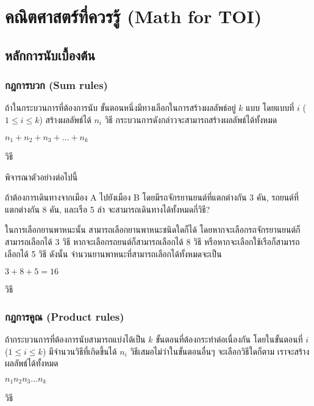 \chapter{คณิตศาสตร์ที่ควรรู้ (Math for TOI)}
\section{หลักการนับเบื้องต้น}
\subsection{กฎการบวก (Sum rules)}
\begin{theorem}
ถ้าในกระบวนการที่ต้องการนับ ขั้นตอนหนึ่งมีทางเลือกในการสร้างผลลัพธ์อยู่ $k$ แบบ โดยแบบที่ $i$ ($1 \leq i \leq k$) สร้างผลลัพธ์ได้ $n_i$ วิธี กระบวนการดังกล่าวจะสามารถสร้างผลลัพธ์ได้ทั้งหมด
\begin{center}
$n_1+n_2+n_3+...+n_k$
\end{center}
วิธี  
\end{theorem}

พิจารณาตัวอย่างต่อไปนี้
\begin{example}
ถ้าต้องการเดินทางจากเมือง A ไปยังเมือง B โดยมีรถจักรยานยนต์ที่แตกต่างกัน 3 คัน, รถยนต์ที่แตกต่างกัน 8 คัน, และเรือ 5 ลำ จะสามารถเดินทางได้ทั้งหมดกี่วิธี?

ในการเลือกยานพาหนะนั้น สามารถเลือกยานพาหนะชนิดใดก็ได้ โดยหากจะเลือกรถจักรยานยนต์ก็สามารถเลือกได้ 3 วิธี หากจะเลือกรถยนต์ก็สามารถเลือกได้ 8 วิธี หรือหากจะเลือกใช้เรือก็สามารถเลือกได้ 5 วิธี ดังนั้น จำนวนยานพาหนะที่สามารถเลือกได้ทั้งหมดจะเป็น
\begin{center}
$3+8+5=16$
\end{center}
วิธี
\end{example}

\newpage

\subsection{กฎการคูณ (Product rules)}
\begin{theorem}
ถ้ากระบวนการที่ต้องการนับสามารถแบ่งได้เป็น $k$ ขั้นตอนที่ต้องกระทำต่อเนื่องกัน โดยในขั้นตอนที่ $i$ ($1 \leq i \leq k$) มีจำนวนวิธีที่เกิดขึ้นได้ $n_i$ วิธีเสมอไม่ว่าในขั้นตอนอื่นๆ จะเลือกวิธีใดก็ตาม เราจะสร้างผลลัพธ์ได้ทั้งหมด
\begin{center}
$n_1n_2n_3...n_k$
\end{center}
วิธี
\end{theorem}

